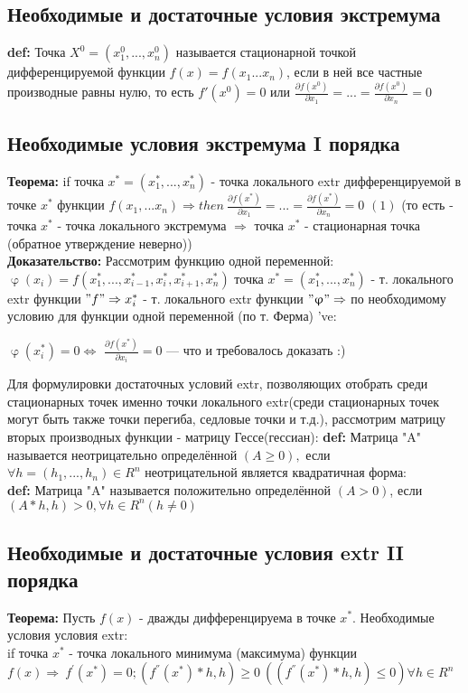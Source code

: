 \subsection*{Необходимые и достаточные условия экстремума}
\textbf{def:} Точка $X^0=(x^0_1,...,x^0_n)$ называется стационарной точкой дифференцируемой функции $f(x)=f(x_1... x_n)$, если в ней все частные производные равны нулю, то есть $f'(x^0)=0$ или $\frac{\partial f(x^0)}{\partial x_1} = ... = \frac{\partial f(x^0)}{\partial x_n} = 0$
\subsection*{Необходимые условия экстремума I порядка}
\textbf{Теорема: }if точка $x^*=(x_1^*, ..., x_n^*)$ - точка локального extr дифференцируемой в точке $x^* $ функции $ f(x_1, ... x_n) \Rightarrow then \ \frac{\partial f(x^*)}{\partial x_1} = ... = \frac{\partial f(x^*)}{\partial x_n} = 0$ $(1)$ (то есть - точка $x^{*}$ - точка локального экстремума $\Rightarrow$ точка $x^{*}$ - стационарная точка (обратное утверждение неверно)) \\ [2mm]
\textbf{Доказательство:} Рассмотрим функцию одной переменной:\\ $\upvarphi (x_i)=f(x_1^*,..., x_{i-1}^*, x_i^*, x_{i+1}^*, x_n^*)$ точка $x^*=(x_1^*,...,x_n^*)$ - т. локального extr функции $"f" \Rightarrow x_i^*$ - т. локального extr функции $"\upvarphi" \Rightarrow$ по необходимому условию для функции одной переменной (по т. Ферма) 've:
\begin{center}
$\upvarphi(x_i^*)=0 \Leftrightarrow $ $\frac{\partial f(x^*)}{\partial x_i} = 0$ --- что и требовалось доказать :)
\end{center}
Для формулировки достаточных условий extr, позволяющих отобрать среди стационарных точек именно точки локального extr(среди стационарных точек могут быть также точки перегиба, седловые точки и т.д.), рассмотрим матрицу вторых производных функции - матрицу Гессе(гессиан):
\textbf{def:} Матрица "A" называется неотрицательно определённой $(A \geq 0),$  если $\forall h = (h_1,...,h_n) \in R^n$ неотрицательной является квадратичная форма:
 \\ [2mm]
\textbf{def:} Матрица "A" называется положительно определённой $(A>0)$, если $(A*h, h)>0, \forall h \in R^n (h \neq 0)$
\newpage
\subsection*{Необходимые и достаточные условия extr II порядка}
\textbf{Теорема:} Пусть $f(x)$ - дважды дифференцируема в точке $x^*$. Необходимые условия условия extr: \\
if точка $x^*$ - точка локального минимума (максимума) функции $
f(x) \Rightarrow \  f^{'}(x^*)=0; (f^{''}(x^*)*h, h) \geq 0 \ ((f^{''}(x^*)*h, h) \leq 0) \forall h \in R^n$
